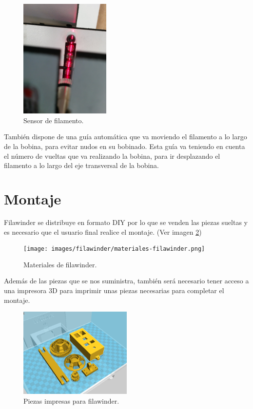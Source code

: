     \begin{figure}[H]
            \centering
            \includegraphics[width=0.4\textwidth]{images/filawinder/Sensor-filamento.jpg}
            \caption{Sensor de filamento.}
            \label{fig:winder_sensor}
    \end{figure}

También dispone de una guía automática que va moviendo el filamento a lo largo de la bobina, para evitar nudos en su bobinado. Esta guía va teniendo en cuenta el número de vueltas que va realizando la bobina, para ir desplazando el filamento a lo largo del eje transversal de la bobina.
\newpage{}
\section{Montaje}

Filawinder se distribuye en formato DIY por lo que se venden las piezas sueltas y es necesario que el usuario final realice el montaje. (Ver imagen \ref{fig:winder_material})
    \begin{figure}[H]
            \centering
            \texttt{[image: images/filawinder/materiales-filawinder.png]}
            \caption{Materiales de filawinder.}
            \label{fig:winder_material}
    \end{figure}
Además de las piezas que se nos suministra, también será necesario tener acceso a una impresora 3D para imprimir unas piezas necesarias para completar el montaje.

    \begin{figure}[H]
            \centering
            \includegraphics[width=0.5\textwidth]{images/filawinder/piezas-impresas.png}
            \caption{Piezas impresas para filawinder.}
            \label{fig:winder_piezas}
    \end{figure}


